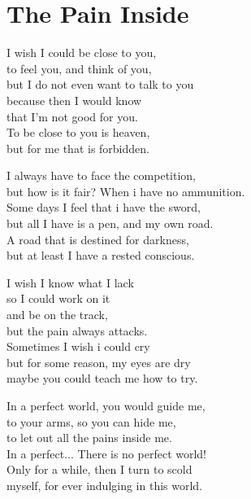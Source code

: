 \documentclass[14pt, a4paper]{memoir}
\begin{document}
\section*{\centering The Pain Inside}\vspace{1cm}

I wish I could be close to you,\\
to feel you, and think of you, \\
but I do not even want to talk to you\\ 
because then I would know \\
that I'm not good for you.\\
To be close to you is heaven,\\
but for me that is forbidden.\bigbreak

I always have to face the competition,\\
but how is it fair? When i have no ammunition.\\
Some days I feel that i have the sword,\\
but all I have is a pen, and my own road.\\
A road that is destined for darkness,\\
but at least I have a rested conscious.\bigbreak

I wish I know what I lack\\
so I could work on it \\
and be on the track,\\
but the pain always attacks.\\
Sometimes I wish i could cry \\
but for some reason, my eyes are dry\\
maybe you could teach me how to try.\bigbreak

In a perfect world, you would guide me,\\
to your arms, so you can hide me,\\
to let out all the pains inside me.\\
In a perfect... There is no perfect world!\\
Only for a while, then I turn to scold\\
myself, for ever indulging in this world.
\end{document}
